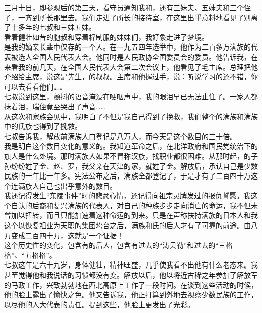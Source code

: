 三月十日，即参观后的第三天，看守员通知我和，还有三妹夫、五妹夫和三个侄子，一齐到所长那里去。我们走进了所长的接待室，在这里出乎意料地看见了别离了十多年的七叔和三妹五妹。\\

看着健壮如昔的胞叔和穿着棉制服的妹妹们，我好象走进了梦境。\\

是我的嫡亲长辈中仅存的一个人。在一九五四年选举中，他作为二百多万满族的代表被选人全国人民代表大会。他同时是人民政协全国委员会的委员。他告诉我，在来看我的前几天，在全国人民代表大会第二次会议上，他看见了毛主席。总理把他介绍给主席，说这是先生，的叔叔。主席和他握过手，说：听说学习的还不错，你可以去看看他们……\\

七叔说到这里，颤抖的语音淹没在哽咽声中，我的眼泪早已无法止住了。一家人都抹着泪，瑞侄竟至哭出了声音……\\

从这次和家族会见中，我明白了不但是我自己得到了挽救，我们整个的满族和满族中的氏族也得到了挽救。\\

七叔告诉我，解放前满族人口登记是八万人，而今天是这个数目的三十倍。\\

我是明白这个数目变化的意义的。我知道革命之后，在北洋政府和国民党统治下的旗人是什么处境。那时满族人如果不冒称汉族，找职业都很困难。从那时起，的子孙纷纷姓了金、赵、罗，我父亲在天津的家，就姓了金。解放后，承认自己是少数民族的一年比一年多。宪法公布之后，满族全都登记了，于是才有了二百四十万这个连满族人自己也出乎意外的数目。\\

我还记得发生“东陵事件”时的悲忿心情，还记得向祖宗灵牌发过的报仇誓愿。我这个自认的后裔和复兴满族的代表人，对自己的种族步步走向消亡的命运，我不但未曾加以扭转，而且只能加速着这种命运的到来。只是在声称扶持满族的日本人和我这个以恢复祖业为天职的集团垮台之后，满族和氏的后人才有了可靠的前途。由八万变成二百四十万，这就是一个证据！\\

这个历史性的变化，包含有的后人，包含有过去的“涛贝勒”和过去的“三格格”、“五格格”。\\

七叔这年是六十九岁，身体健壮，精神旺盛，几乎使我看不出他有什么老态来。我甚至觉得他和我说话的习惯都没有变。解放以后，他以将近古稀之年参加了解放军的马政工作，兴致勃勃地在西北高原上工作了一段时间。在谈到这些活动的时候，他的脸上露出了愉快之色。他又告诉我，他正打算到外地去视察少数民族的工作，以尽他的人大代表的责任。提到这些，他脸上更发出了光彩。\\

